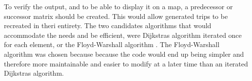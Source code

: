

To verify the output, and to be able to display it on a map, a predecessor or successor matrix should be created. This would allow generated trips to be recreated in theri entirety. The two candidates algorithms that would accommodate the needs and be efficient, were Dijkstras algorithm \citep{dijkstra1959note} iterated once for each element, or the Floyd-Warshall algorithm \citep{floyd1962algorithm}. The Floyd-Warshall algorithm was chosen because because the code would end up being simpler and therefore more maintainable and easier to modify at a later time than an iterated Dijkstras algorithm.

